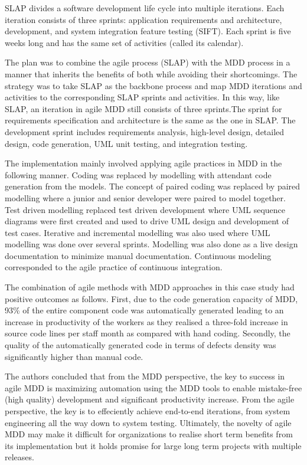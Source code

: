 \documentclass[10pt, a4paper, twocolumn]{article}
\begin{document}
SLAP divides a software development life cycle into multiple iterations. Each iteration consists of three sprints: application requirements and architecture, development, and system integration feature testing (SIFT). Each sprint is five weeks long and has the same set of activities (called its calendar).

The plan was to combine the agile process (SLAP) with the MDD process in a manner that inherits the benefits of both while avoiding their shortcomings. The strategy was to take SLAP as the backbone process and map MDD iterations and activities to the corresponding SLAP sprints and activities. In this way, like SLAP, an iteration in agile MDD still consists of three sprints.The sprint for requirements specification and architecture is the same as the one in SLAP. The development sprint includes requirements analysis, high-level design, detailed design, code generation, UML unit testing, and integration testing. 

The implementation mainly involved applying agile practices in MDD in the following manner. Coding was replaced by modelling with attendant code generation from the models. The concept of paired coding was replaced by paired modelling where a junior and senior developer were paired to model together. Test driven modelling replaced test driven development where UML sequence diagrams were first created and used to drive UML design and development of test cases. Iterative and incremental modelling was also used where UML modelling was done over several sprints. Modelling was also done as a live design documentation to minimize manual documentation. Continuous modeling corresponded to the agile practice of continuous integration.

The combination of agile methods with MDD approaches in this case study had positive outcomes as follows. First, due to the code generation capacity of MDD, 93\% of the entire component code was automatically generated leading to an increase in productivity of the workers as they realised a three-fold increase in source code lines per staff month as compared with hand coding. Secondly, the quality of the automatically generated code in terms of defects density was significantly higher than manual code. 

The authors concluded that from the MDD perspective, the key to success in agile MDD is maximizing automation using the MDD tools to enable mistake-free (high quality) development and significant productivity increase. From the agile perspective, the key is to effeciently achieve end-to-end iterations, from system engineering all the way down to system testing. Ultimately, the novelty of agile MDD may make it difficult for organizations to realise short term benefits from its implementation but it holds promise for large long term projects with multiple releases.
\end{document}
